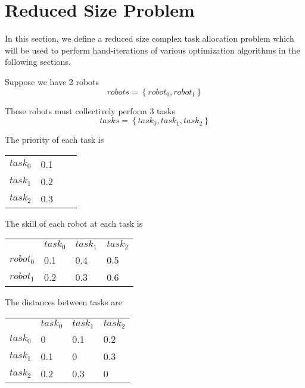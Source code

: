\documentclass[a4paper]{article}
\begin{document}
\section{Reduced Size Problem}


In this section, we define a reduced size complex task allocation problem which will be used to perform hand-iterations of various optimization algorithms in the following sections.

Suppose we have 2 robots
$$\mathit{robots} = \left\{ \mathit{robot}_0, \mathit{robot}_1 \right\}$$

These robots must collectively perform 3 tasks
$$\mathit{tasks} = \left\{ \mathit{task}_0, \mathit{task}_1,  \mathit{task}_2 \right\}$$

The priority of each task is

\begin{tabular}{llll}
$\mathit{task}_0$  & 0.1 \\
$\mathit{task}_1$  & 0.2 \\
$\mathit{task}_2$  & 0.3 \\
\end{tabular}
\vspace{1.5em}

The skill of each robot  at each task is

\begin{tabular}{llll}
                   & $\mathit{task}_0$ & $\mathit{task}_1$ & $\mathit{task}_2$ \\
$\mathit{robot}_0$ & 0.1               & 0.4               & 0.5               \\
$\mathit{robot}_1$ & 0.2               & 0.3               & 0.6               \\
\end{tabular}
\vspace{1.5em}

The distances between tasks are

\begin{tabular}{llll}
                   & $\mathit{task}_0$ & $\mathit{task}_1$ & $\mathit{task}_2$ \\
$\mathit{task}_0$  & 0                 & 0.1               & 0.2               \\
$\mathit{task}_1$  & 0.1               & 0                 & 0.3               \\
$\mathit{task}_2$  & 0.2               & 0.3               & 0                 \\
\end{tabular}
\vspace{1.5em}
\end{document}
